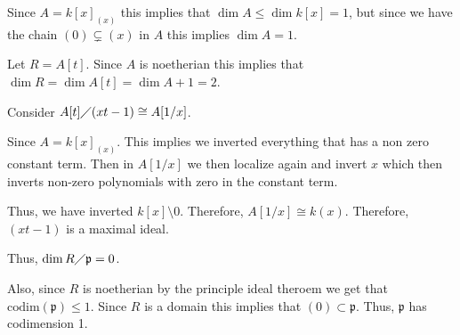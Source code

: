 \documentclass[12pt, letterpaper]{article}
\newcommand{\p}{\mathfrak{p}}
\begin{document}
\begin{problem}{}
    
\end{problem}
\begin{problemproof}
    Since $A=k[x]_{(x)}$ this implies that $\dim A \leq \dim k[x]=1$, but since we have the chain $(0) \subsetneq (x)$ in $A$ this implies $\dim A =1$.

    Let $R=A[t]$. Since $A$ is noetherian this implies that $\dim R = \dim A[t] = \dim A + 1 = 2$.

    Consider $A[t] \diagup (xt-1) \cong A[1/x]$.

    Since $A=k[x]_{(x)}$. This implies we inverted everything that has a non zero constant term. Then in $A[1/x]$ we then localize again and invert $x$ which then inverts non-zero polynomials with zero in the constant term.

    Thus, we have inverted $k[x] \setminus {0}$. Therefore, $A[1/x] \cong k(x)$. Therefore, $(xt-1)$ is a maximal ideal.

    Thus, $\dim R \diagup \p = 0$.

    Also, since $R$ is noetherian by the principle ideal theroem we get that $\mathrm{codim}(\p) \leq 1$. Since $R$ is a domain this implies that $(0) \subset \p$. Thus, $\p$ has codimension 1.
\end{problemproof}
\end{document}
